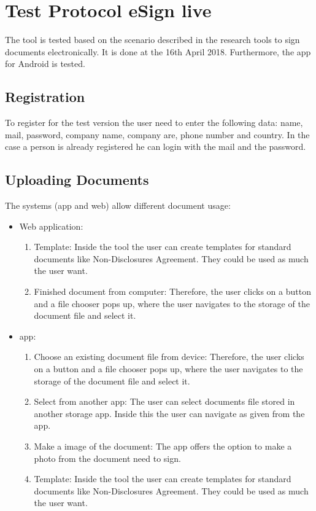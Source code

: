 \section{Test Protocol eSign live}
\label{sec:esign}
The tool is tested based on the scenario described in the research tools to sign documents electronically. It is done at the 16th April 2018. Furthermore, the \gls{app} for Android is tested.

\subsection{Registration}
To register for  the test version the user need to enter the following data: name, mail, password, company name, company are, phone number and country. In the case a person is already registered he can login with the mail and the password.

\subsection{Uploading Documents}
The systems (\gls{app} and web) allow different document usage:
\begin{itemize}
	\item Web application:
	\begin{enumerate}
		\item Template: Inside the tool the user can create templates for standard documents like Non-Disclosures Agreement. They could be used as much the user want.
		\item Finished document from computer: Therefore, the user clicks on a button and a file chooser pops up, where the user navigates to the storage of the document file and select it.
	\end{enumerate}
	\item \Gls{app}:
	\begin{enumerate}
		\item Choose an existing document file from device: Therefore, the user clicks on a button and a file chooser pops up, where the user navigates to the storage of the document file and select it.
		\item Select from another \gls{app}: The user can select documents file stored in another storage \gls{app}. Inside this the user can navigate as given from the \gls{app}.
		\item Make a image of the document: The \gls{app} offers the option to make a photo from the document need to sign.
		\item Template: Inside the tool the user can create templates for standard documents like Non-Disclosures Agreement. They could be used as much the user want.
	\end{enumerate}
\end{itemize}

